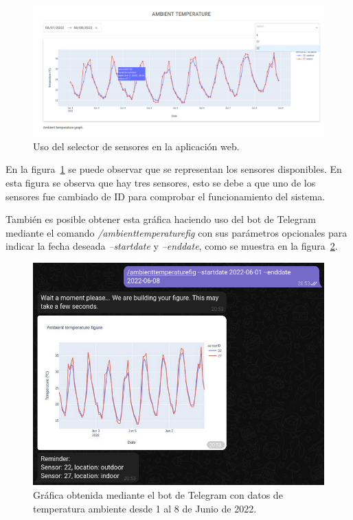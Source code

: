 \documentclass[a4paper, 12pt, oneside]{book}
\begin{document}
\begin{figure}[H]
	\centering
    \includegraphics[width=12cm, keepaspectratio]{img/desplegable_sensores}
    \caption{Uso del selector de sensores en la aplicación web.}
    \label{figura:desplegable_sensores}
\end{figure}

En la figura~\ref{figura:desplegable_sensores} se puede observar que se representan los sensores disponibles. En esta figura se observa que hay tres sensores, esto se debe a que uno de los sensores fue cambiado de ID para comprobar el funcionamiento del sistema.


También es posible obtener esta gráfica haciendo uso del bot de Telegram mediante el comando \textit{/ambienttemperaturefig} con sus parámetros opcionales para indicar la fecha deseada \textit{--startdate} y \textit{--enddate}, como se muestra en la figura~\ref{figura:telegram_ambient_temperature_01_08_junio}.
\begin{figure}[H]
	\centering
    \includegraphics[width=12cm, keepaspectratio]{img/telegram_ambient_temperature_01_08_junio}
    \caption{Gráfica obtenida mediante el bot de Telegram con datos de temperatura ambiente desde 1 al 8 de Junio de 2022.}
    \label{figura:telegram_ambient_temperature_01_08_junio}
\end{figure}
\end{document}
